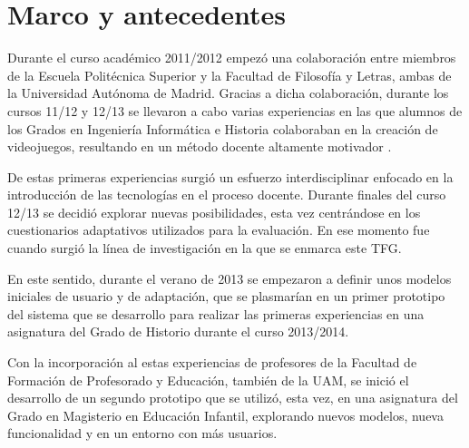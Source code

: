 


\section{Marco y antecedentes}


Durante el curso académico 2011/2012 empezó una colaboración entre miembros de la Escuela Politécnica Superior y la Facultad de Filosofía y Letras, ambas de la Universidad Autónoma de Madrid. Gracias a dicha colaboración, durante los cursos 11/12 y 12/13 se llevaron a cabo varias experiencias en las que alumnos de los Grados en Ingeniería Informática e Historia colaboraban en la creación de videojuegos, resultando en un método docente altamente motivador \cite{Sevilla12}\cite{Molins14Videogames}.

De estas primeras experiencias surgió un esfuerzo interdisciplinar enfocado en la introducción de las tecnologías en el proceso docente. Durante finales del curso 12/13 se decidió explorar nuevas posibilidades, esta vez centrándose en los cuestionarios adaptativos utilizados para la evaluación. En ese momento fue cuando surgió la línea de investigación en la que se enmarca este TFG. 

En este sentido, durante el verano de 2013 se empezaron a definir unos modelos iniciales de usuario y de adaptación, que se plasmarían en un primer prototipo del sistema que se desarrollo para realizar las primeras experiencias en una asignatura del Grado de Historio durante el curso 2013/2014.

Con la incorporación al estas experiencias de profesores de la Facultad de Formación de Profesorado y Educación, también de la UAM, se inició el desarrollo de un segundo prototipo que se utilizó, esta vez, en una asignatura del Grado en Magisterio en Educación Infantil, explorando nuevos modelos, nueva funcionalidad y en un entorno con más usuarios.


